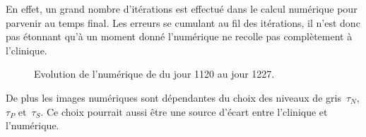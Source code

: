 \documentclass[main.tex]{subfiles}
\begin{document}
En effet, un grand nombre d'itérations est effectué dans le calcul numérique pour parvenir au temps final. Les erreurs se cumulant au fil des itérations, il n'est donc pas étonnant qu'à un moment donné l'\hetero numérique ne recolle pas complètement à l'\hetero clinique.


\begin{figure}
\centering
{}
\caption{\label{fig:baisse_hetero_fin_simu} Evolution de l'\hetero numérique de \Nber du jour 1120 au jour 1227.}
\end{figure}


De plus les images numériques sont dépendantes du choix des niveaux de gris~$\tau_N$, $\tau_P$ et~$\tau_S$. Ce choix pourrait aussi être une source d'écart entre l'\hetero clinique et l'\hetero numérique.
\end{document}
